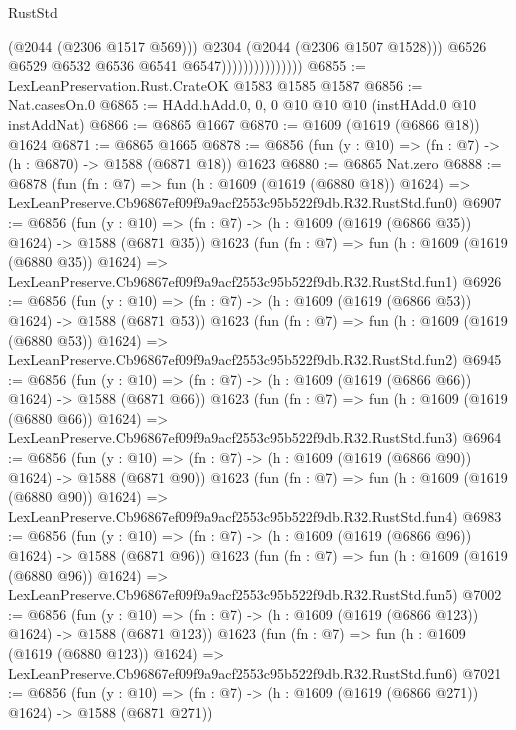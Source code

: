 \begin{lexlean}{RustStd}
\begin{coremodule}
                                      (@2044 (@2306 @1517 @569)))
                                    @2304
                                    (@2044 (@2306 @1507 @1528)))
                                  @6526
                                  @6529
                                  @6532
                                  @6536
                                  @6541
                                  @6547)))))))))))))))
@6855 := LexLeanPreservation.Rust.CrateOK @1583 @1585 @1587
@6856 := Nat.casesOn.{0}
@6865 := HAdd.hAdd.{0, 0, 0} @10 @10 @10 (instHAdd.{0} @10 instAddNat)
@6866 := @6865 @1667
@6870 := @1609 (@1619 (@6866 @18)) @1624
@6871 := @6865 @1665
@6878 := @6856 (fun (y : @10) => (fn : @7) -> (h : @6870) -> @1588 (@6871 @18)) @1623
@6880 := @6865 Nat.zero
@6888 := @6878
    (fun (fn : @7) =>
    fun (h : @1609 (@1619 (@6880 @18)) @1624) =>
    LexLeanPreserve.Cb96867ef09f9a9acf2553c95b522f9db.R32.RustStd.fun0)
@6907 := @6856
    (fun (y : @10) => (fn : @7) -> (h : @1609 (@1619 (@6866 @35)) @1624) -> @1588 (@6871 @35))
    @1623
    (fun (fn : @7) =>
    fun (h : @1609 (@1619 (@6880 @35)) @1624) =>
    LexLeanPreserve.Cb96867ef09f9a9acf2553c95b522f9db.R32.RustStd.fun1)
@6926 := @6856
    (fun (y : @10) => (fn : @7) -> (h : @1609 (@1619 (@6866 @53)) @1624) -> @1588 (@6871 @53))
    @1623
    (fun (fn : @7) =>
    fun (h : @1609 (@1619 (@6880 @53)) @1624) =>
    LexLeanPreserve.Cb96867ef09f9a9acf2553c95b522f9db.R32.RustStd.fun2)
@6945 := @6856
    (fun (y : @10) => (fn : @7) -> (h : @1609 (@1619 (@6866 @66)) @1624) -> @1588 (@6871 @66))
    @1623
    (fun (fn : @7) =>
    fun (h : @1609 (@1619 (@6880 @66)) @1624) =>
    LexLeanPreserve.Cb96867ef09f9a9acf2553c95b522f9db.R32.RustStd.fun3)
@6964 := @6856
    (fun (y : @10) => (fn : @7) -> (h : @1609 (@1619 (@6866 @90)) @1624) -> @1588 (@6871 @90))
    @1623
    (fun (fn : @7) =>
    fun (h : @1609 (@1619 (@6880 @90)) @1624) =>
    LexLeanPreserve.Cb96867ef09f9a9acf2553c95b522f9db.R32.RustStd.fun4)
@6983 := @6856
    (fun (y : @10) => (fn : @7) -> (h : @1609 (@1619 (@6866 @96)) @1624) -> @1588 (@6871 @96))
    @1623
    (fun (fn : @7) =>
    fun (h : @1609 (@1619 (@6880 @96)) @1624) =>
    LexLeanPreserve.Cb96867ef09f9a9acf2553c95b522f9db.R32.RustStd.fun5)
@7002 := @6856
    (fun (y : @10) => (fn : @7) -> (h : @1609 (@1619 (@6866 @123)) @1624) -> @1588 (@6871 @123))
    @1623
    (fun (fn : @7) =>
    fun (h : @1609 (@1619 (@6880 @123)) @1624) =>
    LexLeanPreserve.Cb96867ef09f9a9acf2553c95b522f9db.R32.RustStd.fun6)
@7021 := @6856
    (fun (y : @10) => (fn : @7) -> (h : @1609 (@1619 (@6866 @271)) @1624) -> @1588 (@6871 @271))

\end{coremodule}
\end{lexlean}
